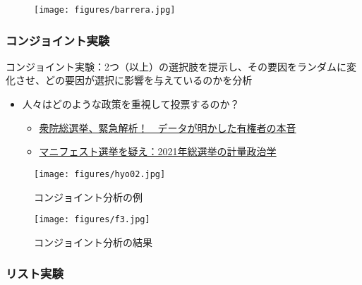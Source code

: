 \documentclass[
  xelatex,
  ja=standard]{bxjsarticle}
\providecommand{\tightlist}{%
  \setlength{\itemsep}{0pt}\setlength{\parskip}{0pt}}\usepackage{longtable,booktabs,array}
\begin{document}
\begin{figure}[htpb]

{\centering \texttt{[image: figures/barrera.jpg]}

}

\caption{\citet{barrera2020}}

\end{figure}

\hypertarget{ux30b3ux30f3ux30b8ux30e7ux30a4ux30f3ux30c8ux5b9fux9a13}{%
\subsubsection{コンジョイント実験}\label{ux30b3ux30f3ux30b8ux30e7ux30a4ux30f3ux30c8ux5b9fux9a13}}

コンジョイント実験：2つ（以上）の選択肢を提示し、その要因をランダムに変化させ、どの要因が選択に影響を与えているのかを分析

\begin{itemize}
\tightlist
\item
  人々はどのような政策を重視して投票するのか？

  \begin{itemize}
  \tightlist
  \item
    \href{https://business.nikkei.com/atcl/seminar/19/00059/120200330/}{衆院総選挙、緊急解析！　データが明かした有権者の本音}
  \item
    \href{https://business.nikkei.com/atcl/gen/19/00351/120200011/}{マニフェスト選挙を疑え：2021年総選挙の計量政治学}
  \end{itemize}
\end{itemize}

\begin{figure}[htpb]

{\centering \texttt{[image: figures/hyo02.jpg]}

}

\caption{コンジョイント分析の例}

\end{figure}

\begin{figure}[htpb]

{\centering \texttt{[image: figures/f3.jpg]}

}

\caption{コンジョイント分析の結果}

\end{figure}

\hypertarget{ux30eaux30b9ux30c8ux5b9fux9a13}{%
\subsubsection{リスト実験}\label{ux30eaux30b9ux30c8ux5b9fux9a13}}
\end{document}
